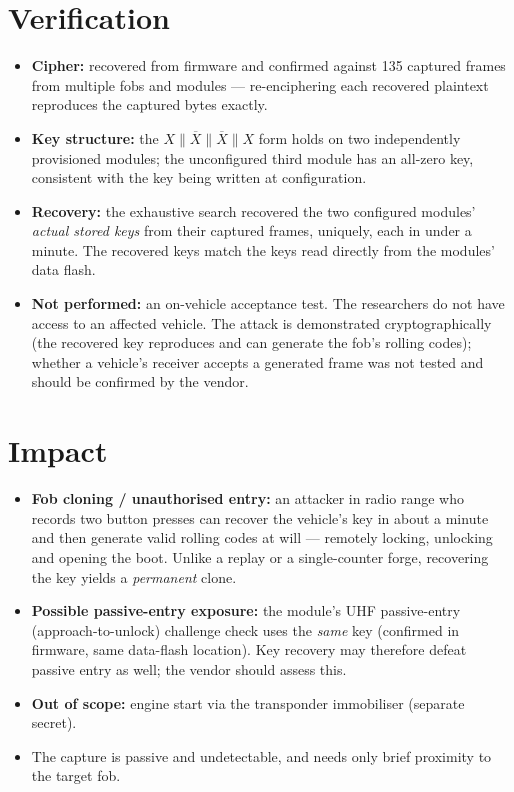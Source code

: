 \documentclass[11pt,a4paper]{article}
\begin{document}
\section{Verification}
\begin{itemize}
\item \textbf{Cipher:} recovered from firmware and confirmed against 135 captured frames from multiple fobs and modules --- re-enciphering each recovered plaintext reproduces the captured bytes exactly.
\item \textbf{Key structure:} the $X\|\overline{X}\|\overline{X}\|X$ form holds on two independently provisioned modules; the unconfigured third module has an all-zero key, consistent with the key being written at configuration.
\item \textbf{Recovery:} the exhaustive search recovered the two configured modules' \emph{actual stored keys} from their captured frames, uniquely, each in under a minute. The recovered keys match the keys read directly from the modules' data flash.
\item \textbf{Not performed:} an on-vehicle acceptance test. The researchers do not have access to an affected vehicle. The attack is demonstrated cryptographically (the recovered key reproduces and can generate the fob's rolling codes); whether a vehicle's receiver accepts a generated frame was not tested and should be confirmed by the vendor.
\end{itemize}

\section{Impact}
\begin{itemize}
\item \textbf{Fob cloning / unauthorised entry:} an attacker in radio range who records two button presses can recover the vehicle's key in about a minute and then generate valid rolling codes at will --- remotely locking, unlocking and opening the boot. Unlike a replay or a single-counter forge, recovering the key yields a \emph{permanent} clone.
\item \textbf{Possible passive-entry exposure:} the module's UHF passive-entry (approach-to-unlock) challenge check uses the \emph{same} key (confirmed in firmware, same data-flash location). Key recovery may therefore defeat passive entry as well; the vendor should assess this.
\item \textbf{Out of scope:} engine start via the transponder immobiliser (separate secret).
\item The capture is passive and undetectable, and needs only brief proximity to the target fob.
\end{itemize}
\end{document}
